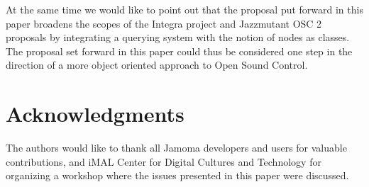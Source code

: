\documentclass{NIME-alternate}
\begin{document}
At the same time we would like to point out that the proposal put forward in this paper broadens the scopes of the Integra project and Jazzmutant OSC 2 proposals by integrating a querying system with the notion of nodes as classes. The proposal set forward in this paper could thus be considered one step in the direction of a more object oriented approach to Open Sound Control.










\section{Acknowledgments} %
\label{sec:acknowledgments}

The authors would like to thank all Jamoma developers and users for valuable contributions, and iMAL Center for Digital Cultures and Technology for organizing a workshop where the issues presented in this paper were discussed.





%

%


\balancecolumns %
\end{document}
